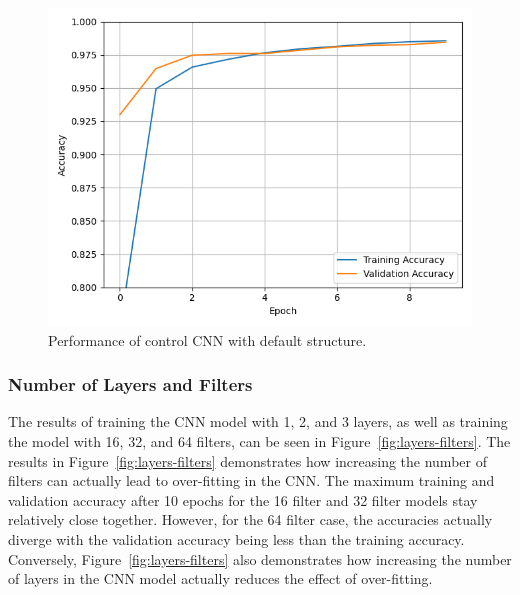 \documentclass[a4paper]{article}
\begin{document}
\begin{figure}[h!]
    \centering
    \includegraphics[scale=0.5]{images/control-cnn.png}
    \caption{Performance of control CNN with default structure.}
    \label{fig:control-cnn}
\end{figure}

\subsubsection{Number of Layers and Filters}

The results of training the CNN model with 1, 2, and 3 layers, as well as training the model with 16, 32, and 64 filters, can be seen in Figure~\ref{fig:layers-filters}. The results in Figure~\ref{fig:layers-filters} demonstrates how increasing the number of filters can actually lead to over-fitting in the CNN. The maximum training and validation accuracy after 10 epochs for the 16 filter and 32 filter models stay relatively close together. However, for the 64 filter case, the accuracies actually diverge with the validation accuracy being less than the training accuracy. Conversely, Figure~\ref{fig:layers-filters} also demonstrates how increasing the number of layers in the CNN model actually reduces the effect of over-fitting.
\end{document}
